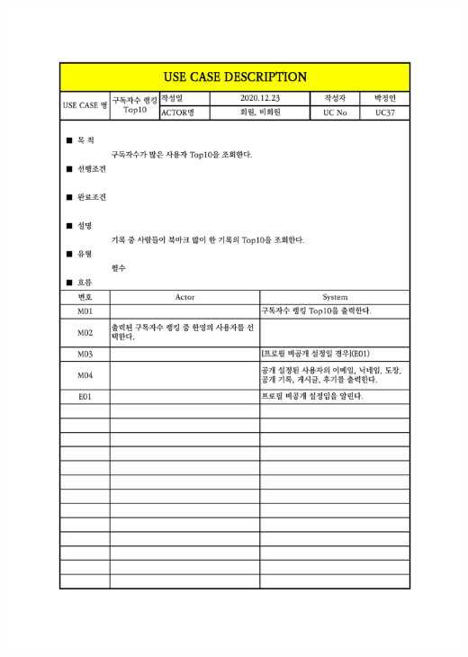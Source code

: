 {{{{{{{{{{{{{{{{{{{{{{{{{{{{{{{{{{{{{{{\includegraphics[width=1.1\textwidth]{./Figure/Design/Display/usecase/037.pdf} \\
}}}}}}}}}}}}}}}}}}}}}}}}}}}}}}}}}}}}}}}
